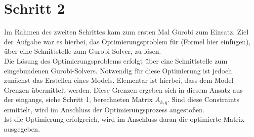 \section{Schritt 2}
Im Rahmen des zweiten Schrittes kam zum ersten Mal Gurobi zum Einsatz. Ziel der Aufgabe war es hierbei, das Optimierungsproblem für (Formel hier einfügen), über eine Schnittstelle zum Gurobi-Solver, zu lösen. \\
Die Lösung des Optimierungsproblems erfolgt über eine Schnittstelle zum eingebundenen Gurobi-Solvers. Notwendig für diese Optimierung ist jedoch zunächst das Erstellen eines Models. Elementar ist hierbei, dass dem Model Grenzen übermittelt werden. Diese Grenzen ergeben sich in diesem Ansatz aus der eingangs, siehe Schritt 1, berechneten Matrix $A_{k,q}$. Sind diese Constraints ermittelt, wird im Anschluss der Optimierungsprozess angestoßen. \\
Ist die Optimierung erfolgreich, wird im Anschluss daran die optimierte Matrix ausgegeben.
